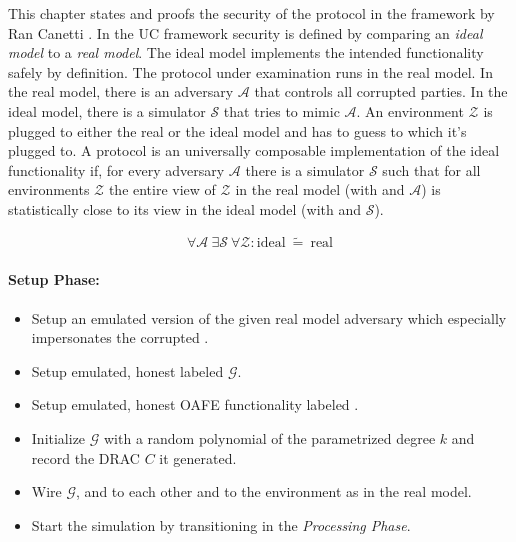 \label{sec:security}

This chapter states and proofs the security of the protocol in the
 framework by Ran Canetti \cite{canetti05}.
In the UC framework security is defined by comparing an \emph{ideal model} to a
\emph{real model}. The ideal model implements the intended functionality
\JWfuncSym{}{} safely by definition. The protocol under examination runs in the
real model. In the real model, there is an adversary $\mathcal{A}$ that controls
all corrupted parties.  In the ideal model, there is a simulator $\mathcal{S}$
that tries to mimic $\mathcal{A}$. An environment $\mathcal{Z}$ is plugged to
either the real or the ideal model and has to guess to which it's plugged to. A
protocol \JWprotoSym{}{} is an universally composable implementation of the
ideal functionality if, for every adversary $\mathcal{A}$ there is a
simulator $\mathcal{S}$ such that for all environments $\mathcal{Z}$ the entire
view of $\mathcal{Z}$ in the real model (with \JWprotoSym{}{} and $\mathcal{A}$)
is statistically close to its view in the ideal model (with \JWfuncSym{}{} and
$\mathcal{S}$).

\begin{align*}
%
\forall \mathcal{A}\ \exists \mathcal{S}\ \forall \mathcal{Z} :
\text{ideal}\ \widetilde{=}\ \text{real}
%
\end{align*}

%
%
\label{sec:simulators}


\label{sec:simulator-david}

\paragraph{Setup Phase:}

\begin{itemize}

  \item Setup an emulated version of the given real model adversary
    \JWadv{} which especially impersonates the corrupted \JWpTwo{}.

  \item Setup emulated, honest \JWpOne{} labeled $\mathcal{G}$.

  \item Setup emulated, honest OAFE functionality labeled \JWfuncSymOAFE{}.

  \item Initialize $\mathcal{G}$ with a random polynomial of the parametrized
    degree $k$ and record the DRAC $C$ it generated.

  \item Wire $\mathcal{G}$, \JWfuncSymOAFE{} and \JWadv{} to each other
    and \JWadv{} to the environment as in the real model.

  \item Start the simulation by transitioning in the \emph{Processing Phase}.

\end{itemize}

